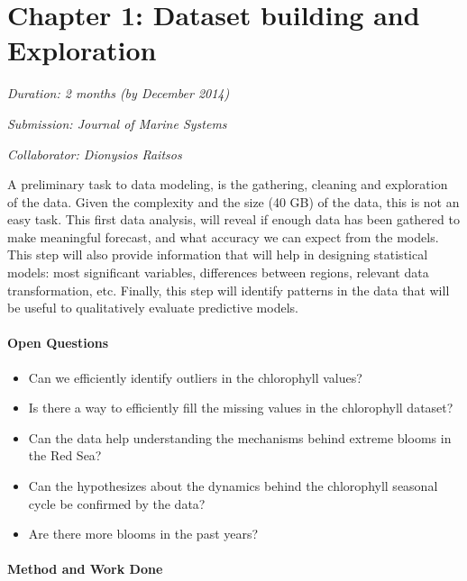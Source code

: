 \section{Chapter 1: Dataset building and Exploration}

\noindent
\emph{Duration: 2 months (by December 2014)}

\noindent
\emph{Submission: Journal of Marine Systems}

\noindent
\emph{Collaborator: Dionysios Raitsos}

A preliminary task to data modeling, is the gathering, cleaning and exploration of the data. Given the complexity and the size (40 GB) of the data, this is not an easy task. This first data analysis, will reveal if enough data has been gathered to make meaningful forecast, and what accuracy we can expect from the models. This step will also provide information that will help in designing statistical models: most significant variables, differences between regions, relevant data transformation, etc. Finally, this step will identify patterns in the data that will be useful to qualitatively evaluate predictive models.

\paragraph{Open Questions}

\begin{itemize}
\item Can we efficiently identify outliers in the chlorophyll values?
\item Is there a way to efficiently fill the missing values in the chlorophyll dataset?
\item Can the data help understanding the mechanisms behind extreme blooms in the Red Sea?
\item Can the hypothesizes about the dynamics behind the chlorophyll seasonal cycle be confirmed by the data?
\item Are there more blooms in the past years?
\end{itemize}

\paragraph{Method and Work Done}

